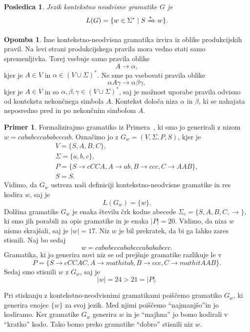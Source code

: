\documentclass{amsart}
\theoremstyle{definition}
\newtheorem{primer}[definicija]{Primer}
\newtheorem{opomba}[definicija]{Opomba}
\theoremstyle{plain} %
\newtheorem{posledica}[definicija]{Posledica}
\begin{document}
\begin{posledica}

    Jezik kontekstno neodvisne gramatike $ G $ je
    \[
        L(G) = \{ w \in \Sigma^* \mid S \xRightarrow{*} w \}.
    \]

\end{posledica}

\begin{opomba}
    
    Ime kontekstno-neodvisna gramatika izvira iz oblike produkcijskih pravil. Na levi
    strani produkcijskega pravila mora vedno stati samo spremenljivka. Torej vsebuje samo
    pravila oblike
    \[
        A \rightarrow \alpha,
    \]
    kjer je  $ A \in V $ in $ \alpha \in ( V \cup \Sigma )^* $. Ne sme pa vsebovati
    pravila oblike
    \[
        \alpha A \gamma \rightarrow \alpha\beta\gamma,
    \]
    kjer je $ A \in V $ in so $ \alpha, \beta, \gamma \in ( V \cup \Sigma )^* $, saj je možnost uporabe
    pravila odvisno od konteksta nekončnega simbola $ A $. Kontekst določa niza $ \alpha $ in $ \beta $,
    ki se nahajata neposredno pred in po nekončnim simbolom $ A $.

\end{opomba}

\begin{primer}
    
    Formalizirajmo gramatiko iz Primera~, ki smo jo generirali z nizom
    $ w = \mathit{cababcccababcccab} $. Označimo jo z $ G_w = ( V, \Sigma, P, S ) $, kjer je 
    \begin{gather*}
        V = \{ S, A, B, C \}, \\
        \Sigma = \{ a, b, c \}, \\
        P = \{ S  \rightarrow  \mathit{cCCA}, A  \rightarrow  \mathit{ab}, B  
        \rightarrow  \mathit{ccc}, C  \rightarrow  \mathit{AAB} \}, \\
        S = S.
    \end{gather*}
    Vidimo, da $ G_w $ ustreza naši definiciji kontekstno-neodvisne gramatike
    in res kodira $ w $, saj je 
    \[
        L(G_w) = \{w\}.
    \]
    Dolžina gramatike $ G_w $ je enaka številu črk kodne abecede $ \Sigma_c = \{ S, A, B, C, \rightarrow \} $,
    ki smo jih porabili za opis gramatike in je enaka $ |P| = 20 $. Vidimo, da niza $ w $ 
    nismo skrajšali, saj je $ |w| = 17 $. Niz $ w $ je bil prekratek, da bi ga lahko
    zares stisnili. Naj bo sedaj
    \[
        w =   \mathit{cababcccababcccabababccc}.
    \]
    Gramatika, ki jo generira novi niz se od prejšnje gramatike razlikuje le v
    \[
        P = \{ S  \rightarrow  \mathit{cCCAC}, A  \rightarrow  mathit{ab}, B  
        \rightarrow  \mathit{ccc}, C  \rightarrow  mathit{AAB} \}.
    \]
    Sedaj smo stisnili $ w $ z $ G_w $, saj je
    \[
        |w| = 24 > 21 = |P|.
    \]

\end{primer}

Pri stiskanju z kontekstno-neodvisnimi gramatikami poiščemo gramatiko $ G_w $, ki generira
enojec $ \{ w \} $ za svoj jezik. Med njimi poiščemo ``najmanjšo''in jo kodiramo.
Ker gramatike $ G_w $ generira $ w $ in je ``majhna'' jo bomo kodirali v ``kratko'' kodo.
Tako bomo preko gramatike ``dobro'' stisnili niz $ w $.
\end{document}
